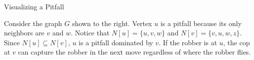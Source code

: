 \documentclass[12pt, a4paper]{article}
\begin{document}
\begin{example}{Visualizing a Pitfall}{}
\begin{minipage}{0.65\textwidth}
Consider the graph $G$ shown to the right. Vertex $u$ is a pitfall because its only neighbors are $v$ and $w$. Notice that $N[u] = \{u, v, w\}$ and $N[v] = \{v, u, w, z\}$. Since $N[u] \subseteq N[v]$, $u$ is a pitfall dominated by $v$. If the robber is at $u$, the cop at $v$ can capture the robber in the next move regardless of where the robber flies.
\end{minipage}
\hfill
\begin{minipage}{0.3\textwidth}
\centering
{}
\end{minipage}
\end{example}
\end{document}

